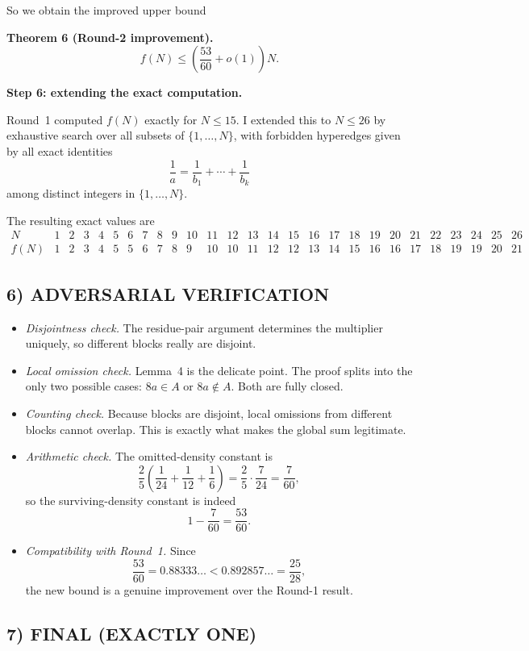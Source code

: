So we obtain the improved upper bound

\medskip
\noindent\textbf{Theorem 6 (Round-2 improvement).}
\[
f(N)\le \left(\frac{53}{60}+o(1)\right)N.
\]

\medskip
\noindent\textbf{Step 6: extending the exact computation.}

Round~1 computed $f(N)$ exactly for $N\le 15$. I extended this to $N\le 26$ by exhaustive search over all subsets of $\{1,\ldots,N\}$, with forbidden hyperedges given by all exact identities
\[
\frac1a=\frac1{b_1}+\cdots+\frac1{b_k}
\]
among distinct integers in $\{1,\ldots,N\}$.

The resulting exact values are
\[
\begin{array}{c|cccccccccccccccccccccccccc}
N
&1&2&3&4&5&6&7&8&9&10&11&12&13&14&15&16&17&18&19&20&21&22&23&24&25&26\\
\hline
f(N)
&1&2&3&4&5&5&6&7&8&9&10&10&11&12&12&13&14&15&16&16&17&18&19&19&20&21
\end{array}
\]

\subsection*{6) ADVERSARIAL VERIFICATION}

\begin{itemize}
\item \emph{Disjointness check.} The residue-pair argument determines the multiplier uniquely, so different blocks really are disjoint.
\item \emph{Local omission check.} Lemma~4 is the delicate point. The proof splits into the only two possible cases: $8a\in A$ or $8a\notin A$. Both are fully closed.
\item \emph{Counting check.} Because blocks are disjoint, local omissions from different blocks cannot overlap. This is exactly what makes the global sum legitimate.
\item \emph{Arithmetic check.} The omitted-density constant is
\[
\frac25\left(\frac1{24}+\frac1{12}+\frac1{6}\right)=\frac25\cdot\frac7{24}=\frac7{60},
\]
so the surviving-density constant is indeed
\[
1-\frac7{60}=\frac{53}{60}.
\]
\item \emph{Compatibility with Round~1.} Since
\[
\frac{53}{60}=0.88333\ldots < 0.892857\ldots=\frac{25}{28},
\]
the new bound is a genuine improvement over the Round-1 result.
\end{itemize}

\subsection*{7) FINAL (EXACTLY ONE)}

